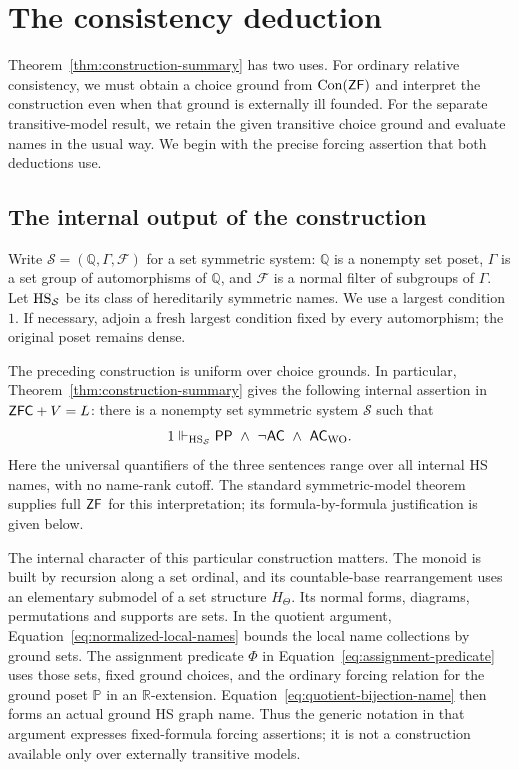\section{The consistency deduction}\label{sec:metatheory}

Theorem~\ref{thm:construction-summary} has two uses. For ordinary
relative consistency, we must obtain a choice ground from
$\operatorname{Con}(\mathsf{ZF})$ and interpret the construction even when that ground
is externally ill founded. For the separate transitive-model result,
we retain the given transitive choice ground and evaluate names in
the usual way. We begin with the precise forcing assertion that
both deductions use.

\subsection{The internal output of the construction}

Write $\mathcal S=(\mathbb Q,\Gamma,\mathcal F)$ for a set
symmetric system: $\mathbb Q$ is a nonempty set poset, $\Gamma$
is a set group of automorphisms of $\mathbb Q$, and $\mathcal F$
is a normal filter of subgroups of $\Gamma$. Let
$\mathrm{HS}_{\mathcal S}$ be its class of hereditarily symmetric names.
We use a largest condition $1$. If necessary, adjoin a fresh
largest condition fixed by every automorphism; the original poset
remains dense.

The preceding construction is uniform over choice grounds. In
particular, Theorem~\ref{thm:construction-summary} gives the
following internal assertion in $\mathsf{ZFC}+V=L$: there is a nonempty
set symmetric system $\mathcal S$ such that
\begin{equation}\label{eq:construction-internal-forcing}
 1\Vdash_{\mathrm{HS}_{\mathcal S}}
          \mathsf{PP}\ \wedge\ \neg\mathsf{AC}\ \wedge\ \mathsf{AC}_{\mathrm{WO}}.
\end{equation}
Here the universal quantifiers of the three sentences range over
all internal HS names, with no name-rank cutoff. The standard
symmetric-model theorem supplies full $\mathsf{ZF}$ for this interpretation;
its formula-by-formula justification is given below.

The internal character of this particular construction matters.
The monoid is built by recursion along a set ordinal, and its
countable-base rearrangement uses an elementary submodel of a set
structure $H_\Theta$. Its normal forms, diagrams, permutations and
supports are sets. In the quotient argument,
Equation~\eqref{eq:normalized-local-names} bounds the local name
collections by ground sets. The assignment predicate
$\Phi$ in Equation~\eqref{eq:assignment-predicate} uses those
sets, fixed ground choices, and the ordinary forcing relation for
the ground poset $\mathbb P$ in an $\mathbb R$-extension.
Equation~\eqref{eq:quotient-bijection-name} then forms an actual
ground HS graph name. Thus the generic notation in that argument
expresses fixed-formula forcing assertions; it is not a construction
available only over externally transitive models.

